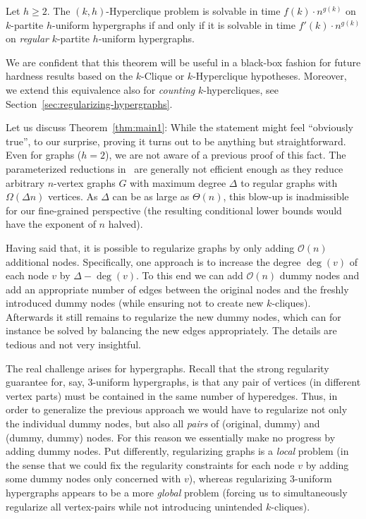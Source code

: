 \documentclass[a4paper,UKenglish,cleveref, autoref, thm-restate,numberwithinsect]{lipics-v2021}
\newcommand{\bigO}{\mathcal{O}}
\begin{document}
\begin{theorem}\label{thm:main1}
Let $h \geq 2$. The $(k, h)$-Hyperclique problem is solvable in time $f(k) \cdot n^{g(k)}$ on $k$-partite $h$-uniform hypergraphs if and only if it is solvable in time $f'(k) \cdot n^{g(k)}$ on \emph{regular} $k$-partite $h$-uniform hypergraphs.
\end{theorem}

We are confident that this theorem will be useful in a black-box fashion for future hardness results based on the $k$-Clique or $k$-Hyperclique hypotheses. Moreover, we extend this equivalence also for \emph{counting} $k$-hypercliques, see Section~\ref{sec:regularizing-hypergraphs}.

\medskip
Let us discuss Theorem~\ref{thm:main1}: While the statement might feel ``obviously true'', to our surprise, proving it turns out to be anything but straightforward. Even for graphs ($h = 2$), we are not aware of a previous proof of this fact. The parameterized reductions in~\cite{Cai08,MathiesonS08,BrandesHK16,CyganFKLMPPS15} are generally not efficient enough as they reduce arbitrary $n$-vertex graphs $G$ with maximum degree $\Delta$ to regular graphs with $\Omega(\Delta n)$ vertices. As $\Delta$ can be as large as $\Theta(n)$, this blow-up is inadmissible for our fine-grained perspective (the resulting conditional lower bounds would have the exponent of $n$ halved).

Having said that, it is possible to regularize graphs by only adding $\bigO(n)$ additional nodes. Specifically, one approach is to increase the degree $\deg(v)$ of each node $v$ by $\Delta-\deg(v)$. To this end we can add $\bigO(n)$ dummy nodes and add an appropriate number of edges between the original nodes and the freshly introduced dummy nodes (while ensuring not to create new $k$-cliques). Afterwards it still remains to regularize the new dummy nodes, which can for instance be solved by balancing the new edges appropriately. The details are tedious and not very insightful.

The real challenge arises for hypergraphs. Recall that the strong regularity guarantee for, say, 3-uniform hypergraphs, is that any pair of vertices (in different vertex parts) must be contained in the same number of hyperedges. Thus, in order to generalize the previous approach we would have to regularize not only the individual dummy nodes, but also all \emph{pairs} of (original, dummy) and (dummy, dummy) nodes. For this reason we essentially make no progress by adding dummy nodes. Put differently, regularizing graphs is a \emph{local} problem (in the sense that we could fix the regularity constraints for each node $v$ by adding some dummy nodes only concerned with $v$), whereas regularizing 3-uniform hypergraphs appears to be a more \emph{global} problem (forcing us to simultaneously regularize all vertex-pairs while not introducing unintended $k$-cliques).
\end{document}
